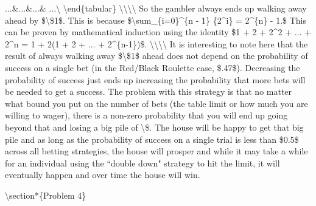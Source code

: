 ...\&...\&...\& ...\textbackslash{}
\textbackslash{}end\{tabular\}
\textbackslash{}\textbackslash{}\textbackslash{}\textbackslash{}
So the gambler always ends up walking away ahead by \$\textbackslash{}\$1\$.  This is because \$\textbackslash{}sum\_\{i=0\}\^{}\{n - 1\} \{2\^{}i\} = 2\^{}\{n\} - 1.\$ This can be proven by mathematical induction using the identity \$1 + 2 + 2\^{}2 + ... + 2\^{}n = 1 + 2(1 + 2 + ... + 2\^{}\{n-1\})\$. 
\textbackslash{}\textbackslash{}\textbackslash{}\textbackslash{}
It is interesting to note here that the result of always walking away \$\textbackslash{}\$1\$ ahead does not depend on the probability of success on a single bet (in the Red/Black Roulette case, \$.47\$).  Decreasing the probability of success just ends up increasing the probability that more bets will be needed to get a success.  The problem with this strategy is that no matter what bound you put on the number of bets (the table limit or how much you are willing to wager), there is a non-zero probability that you will end up going beyond that and losing a big pile of \textbackslash{}\$.  The house will be happy to get that big pile and as long as the probability of success on a single trial is less than \$0.5\$ across all betting strategies, the house will prosper and while it may take a while for an individual using the ``double down" strategy to hit the limit, it will eventually happen and over time the house will win.


\textbackslash{}section*\{Problem 4\}

